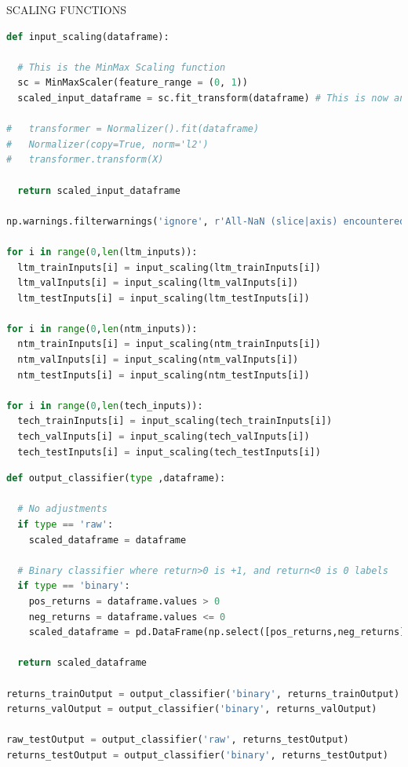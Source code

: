 \documentclass[10pt,onecolumn,letterpaper]{article}
\begin{document}
SCALING FUNCTIONS

\begin{lstlisting}[language=Python, breaklines=true]
def input_scaling(dataframe):
  
  # This is the MinMax Scaling function 
  sc = MinMaxScaler(feature_range = (0, 1))
  scaled_input_dataframe = sc.fit_transform(dataframe) # This is now an n-dimensional array type
  
#   transformer = Normalizer().fit(dataframe)
#   Normalizer(copy=True, norm='l2')
#   transformer.transform(X)
  
  return scaled_input_dataframe

np.warnings.filterwarnings('ignore', r'All-NaN (slice|axis) encountered')

for i in range(0,len(ltm_inputs)):
  ltm_trainInputs[i] = input_scaling(ltm_trainInputs[i])
  ltm_valInputs[i] = input_scaling(ltm_valInputs[i])
  ltm_testInputs[i] = input_scaling(ltm_testInputs[i])
  
for i in range(0,len(ntm_inputs)):
  ntm_trainInputs[i] = input_scaling(ntm_trainInputs[i])
  ntm_valInputs[i] = input_scaling(ntm_valInputs[i])
  ntm_testInputs[i] = input_scaling(ntm_testInputs[i])

for i in range(0,len(tech_inputs)):
  tech_trainInputs[i] = input_scaling(tech_trainInputs[i])
  tech_valInputs[i] = input_scaling(tech_valInputs[i])
  tech_testInputs[i] = input_scaling(tech_testInputs[i])
\end{lstlisting} 

\begin{lstlisting}[language=Python, breaklines=true]
def output_classifier(type ,dataframe): 
  
  # No adjustments
  if type == 'raw':
    scaled_dataframe = dataframe
  
  # Binary classifier where return>0 is +1, and return<0 is 0 labels
  if type == 'binary':
    pos_returns = dataframe.values > 0
    neg_returns = dataframe.values <= 0 
    scaled_dataframe = pd.DataFrame(np.select([pos_returns,neg_returns], [1,0], default='NaN'), index=dataframe.index, columns=dataframe.columns)

  return scaled_dataframe

returns_trainOutput = output_classifier('binary', returns_trainOutput)
returns_valOutput = output_classifier('binary', returns_valOutput)

raw_testOutput = output_classifier('raw', returns_testOutput)
returns_testOutput = output_classifier('binary', returns_testOutput)
\end{lstlisting} 
\end{document}

